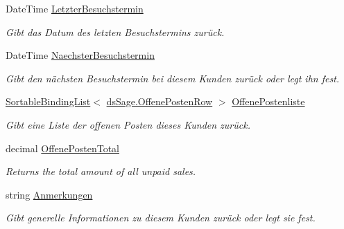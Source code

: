 \begin{DoxyCompactItemize}
\item 
Date\+Time \hyperlink{class_products_1_1_model_1_1_entities_1_1_kunde_a7ddb99d70b5d3fc47a8e12652d547bf4}{Letzter\+Besuchstermin}
\begin{DoxyCompactList}\small\item\em Gibt das Datum des letzten Besuchstermins zurück. \end{DoxyCompactList}\item 
Date\+Time \hyperlink{class_products_1_1_model_1_1_entities_1_1_kunde_a630357deb496eb0e1a639e4594363e61}{Naechster\+Besuchstermin}
\begin{DoxyCompactList}\small\item\em Gibt den nächsten Besuchstermin bei diesem Kunden zurück oder legt ihn fest. \end{DoxyCompactList}\item 
\hyperlink{class_products_1_1_common_1_1_sortable_binding_list}{Sortable\+Binding\+List}$<$ \hyperlink{class_products_1_1_data_1_1ds_sage_1_1_offene_posten_row}{ds\+Sage.\+Offene\+Posten\+Row} $>$ \hyperlink{class_products_1_1_model_1_1_entities_1_1_kunde_a79b3eaa18f4b3b6f27617aa7c655b422}{Offene\+Postenliste}
\begin{DoxyCompactList}\small\item\em Gibt eine Liste der offenen Posten dieses Kunden zurück. \end{DoxyCompactList}\item 
decimal \hyperlink{class_products_1_1_model_1_1_entities_1_1_kunde_a742ca8285494d1745293d3f9570392bb}{Offene\+Posten\+Total}
\begin{DoxyCompactList}\small\item\em Returns the total amount of all unpaid sales. \end{DoxyCompactList}\item 
string \hyperlink{class_products_1_1_model_1_1_entities_1_1_kunde_a0e52f0bcc71bb4702837a121b1078c47}{Anmerkungen}
\begin{DoxyCompactList}\small\item\em Gibt generelle Informationen zu diesem Kunden zurück oder legt sie fest. \end{DoxyCompactList}\item 

\end{DoxyCompactItemize}
